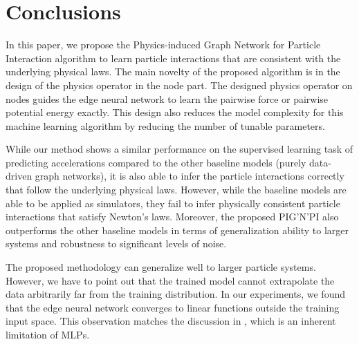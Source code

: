 \documentclass{article}
\newcommand{\pignpi}{PIG'N'PI\xspace}
\begin{document}
\section{Conclusions}
\label{sec:conclusions}
In this paper, we propose the Physics-induced Graph Network for Particle Interaction algorithm to learn  particle interactions that are consistent with the underlying physical laws. The main novelty of the proposed algorithm is in the design of the physics operator in the node part. The designed physics operator on nodes guides the edge neural network to learn the pairwise force or pairwise potential energy exactly. This design also reduces the model complexity for this machine learning algorithm by reducing the number of tunable parameters. 


While our method shows a similar performance on the supervised learning task of predicting accelerations compared to the other baseline models (purely data-driven graph networks), it is also able to infer the particle interactions correctly that follow the underlying physical laws. However, while the baseline models are able to be applied as simulators, they fail to infer physically consistent particle interactions that satisfy Newton's laws. Moreover, the proposed \pignpi also outperforms the other baseline models in terms of generalization ability to larger systems and robustness to significant levels of noise. 

The proposed methodology can generalize well to larger particle systems. However, we have to point out that the trained model cannot extrapolate the data arbitrarily far from the training distribution. In our experiments, we found that the edge neural network converges to linear functions outside the training input space. This observation matches the discussion in \cite{xu2021how}, which is an inherent limitation of MLPs.

\end{document}
